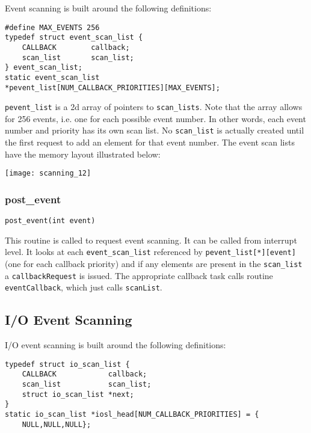 Event scanning is built around the following definitions:

\begin{verbatim}
#define MAX_EVENTS 256
typedef struct event_scan_list {
    CALLBACK        callback;
    scan_list       scan_list;
} event_scan_list;
static event_scan_list
*pevent_list[NUM_CALLBACK_PRIORITIES][MAX_EVENTS];
\end{verbatim}

\verb|pevent_list| is a 2d array of pointers to \verb|scan_lists|.
Note that the array allows for 256 events, i.e. one for each possible event number.
In other words, each event number and priority has its own scan list.
No \verb|scan_list| is actually created until the first request to add an element for that event number.
The event scan lists have the memory layout illustrated below:

\begin{center}
\texttt{[image: scanning\_12]}
\end{center}

\subsubsection{post\_event} 

\begin{verbatim}
post_event(int event)
\end{verbatim}

This routine is called to request event scanning.
It can be called from interrupt level.
It looks at each \verb|event_scan_list| referenced by \verb|pevent_list[*][event]| (one for each callback priority) and if any elements are present in the \verb|scan_list| a \verb|callbackRequest| is issued.
The appropriate callback task calls routine \verb|eventCallback|, which just calls \verb|scanList|. 

\subsection{I/O Event Scanning}

I/O event scanning is built around the following definitions:

\begin{verbatim}
typedef struct io_scan_list {
    CALLBACK            callback;
    scan_list           scan_list;
    struct io_scan_list *next;
}
static io_scan_list *iosl_head[NUM_CALLBACK_PRIORITIES] = {
    NULL,NULL,NULL};
\end{verbatim}

